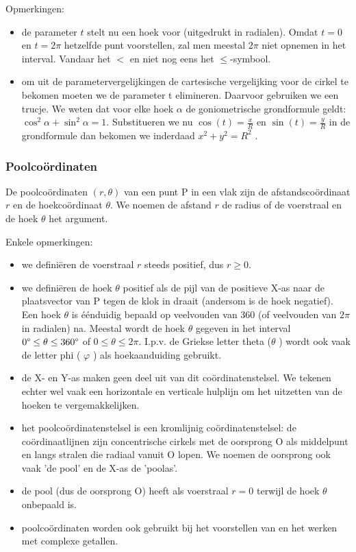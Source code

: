 Opmerkingen:
\begin{itemize}
\item de parameter $t$ stelt nu een hoek voor (uitgedrukt in radialen).
Omdat $t=0$ en $t=2\pi$ hetzelfde punt voorstellen, zal men meestal
$2\pi$ niet opnemen in het interval. Vandaar het $<$ en niet nog
eens het $\leq$-symbool.
\item om uit de parametervergelijkingen de cartesische vergelijking voor
de cirkel te bekomen moeten we de parameter t elimineren. Daarvoor
gebruiken we een trucje. We weten dat voor elke hoek $\alpha$ de
goniometrische grondformule geldt: $\cos^{2}\alpha+\sin^{2}\alpha=1$.
Substitueren we nu $\cos(t)=\frac{x}{R}$ en $\sin(t)=\frac{y}{R}$
in de grondformule dan bekomen we inderdaad $x^{2}+y^{2}=R^{2}$ .
\end{itemize}

\subsubsection{Poolco\"ordinaten}

De poolco\"ordinaten $\left(r,\theta\right)$ van een punt P in een
vlak zijn de afstandsco\"ordinaat $r$ en de hoekco\"ordinaat $\theta$.
We noemen de afstand $r$ de radius of de voerstraal en de hoek $\theta$
het argument.


Enkele opmerkingen:
\begin{itemize}
\item we defini\"eren de voerstraal $r$ steeds positief, dus $r\geq0$.
\item we defini\"eren de hoek $\theta$ positief als de pijl van de positieve
X-as naar de plaatsvector van P tegen de klok in draait (andersom
is de hoek negatief). Een hoek $\theta$ is \'e\'enduidig bepaald op veelvouden
van 360\textdegree{} (of veelvouden van $2\pi$ in radialen) na. Meestal
wordt de hoek $\theta$ gegeven in het interval $0\text{\textdegree}\leq\theta\leq360\text{\textdegree}$
of $0\leq\theta\leq2\pi$. I.p.v. de Griekse letter theta ($\theta$
) wordt ook vaak de letter phi ( $\varphi$ ) als hoekaanduiding gebruikt.
\item de X- en Y-as maken geen deel uit van dit co\"ordinatenstelsel. We tekenen
echter wel vaak een horizontale en verticale hulplijn om het uitzetten
van de hoeken te vergemakkelijken.
\item het poolco\"ordinatenstelsel is een kromlijnig co\"ordinatenstelsel: de
co\"ordinaatlijnen zijn concentrische cirkels met de oorsprong O als
middelpunt en langs stralen die radiaal vanuit O lopen. We noemen
de oorsprong ook vaak 'de pool' en de X-as de 'poolas'.
\item de pool (dus de oorsprong O) heeft als voerstraal $r=0$ terwijl de
hoek $\theta$ onbepaald is.
\item poolco\"ordinaten worden ook gebruikt bij het voorstellen van en het
werken met complexe getallen.
\end{itemize}


